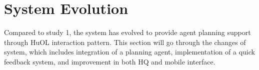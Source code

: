 


\section{System Evolution}
Compared to study 1, the system has evolved to provide agent planning support through HuOL interaction pattern. This section will go through the changes of system, which includes integration of a planning agent, implementation of a quick feedback system, and improvement in both HQ and mobile interface.

